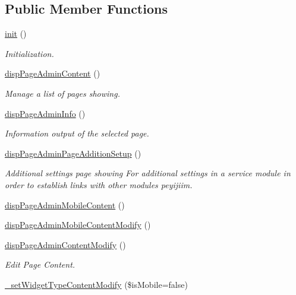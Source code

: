 \subsection*{Public Member Functions}
\begin{DoxyCompactItemize}
\item 
\hyperlink{classpageAdminView_a1b0aaafae4f1de46ba2388457f8ef2cb}{init} ()
\begin{DoxyCompactList}\small\item\em Initialization. \end{DoxyCompactList}\item 
\hyperlink{classpageAdminView_a71a15a59e58bbe4f47af8c051850ad15}{disp\-Page\-Admin\-Content} ()
\begin{DoxyCompactList}\small\item\em Manage a list of pages showing. \end{DoxyCompactList}\item 
\hyperlink{classpageAdminView_aa240ff3b2c7b2befcf4c572916c37ac4}{disp\-Page\-Admin\-Info} ()
\begin{DoxyCompactList}\small\item\em Information output of the selected page. \end{DoxyCompactList}\item 
\hyperlink{classpageAdminView_aad653a82f425e9af960d9ee3998d8662}{disp\-Page\-Admin\-Page\-Addition\-Setup} ()
\begin{DoxyCompactList}\small\item\em Additional settings page showing For additional settings in a service module in order to establish links with other modules peyijiim. \end{DoxyCompactList}\item 
\hyperlink{classpageAdminView_a49a338d91abaf7b5903a06d3c9467b34}{disp\-Page\-Admin\-Mobile\-Content} ()
\item 
\hyperlink{classpageAdminView_a71e87e225509a1c4e761ecc57852c5f5}{disp\-Page\-Admin\-Mobile\-Content\-Modify} ()
\item 
\hyperlink{classpageAdminView_a3396afbab0397643febdf26626c04199}{disp\-Page\-Admin\-Content\-Modify} ()
\begin{DoxyCompactList}\small\item\em Edit Page Content. \end{DoxyCompactList}\item 
\hyperlink{classpageAdminView_a722e1c87ff39044b2ce170f9f7bc5b68}{\-\_\-set\-Widget\-Type\-Content\-Modify} (\$is\-Mobile=false)
\item 

\end{DoxyCompactItemize}
